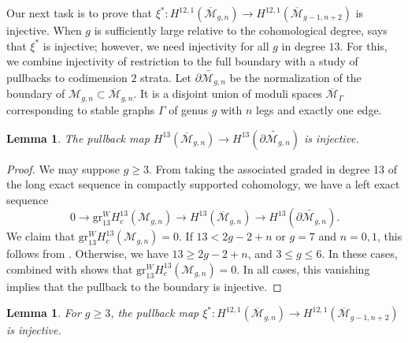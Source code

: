 \documentclass[12pt]{amsart}
\newtheorem{lem}[thm]{Lemma}
\theoremstyle{definition}
\numberwithin{equation}{section}
\newcommand{\M}{\mathcal{M}}
\renewcommand{\tilde}{\widetilde}
\newcommand{\Mb}{\overline{\M}}
\theoremstyle{definition} %
\theoremstyle{remark}
\newcommand{\gr}{\mathrm{gr}}
\begin{document}
Our next task is to prove that $\xi^*\colon H^{12,1}(\Mb_{g,n}) \to H^{12,1}(\Mb_{g-1,n+2})$ is injective. When $g$ is sufficiently large relative to the cohomological degree, \cite[Theorem 2.10]{ArbarelloCornalba} says that $\xi^*$ is injective; however, we need injectivity for all $g$ in degree $13$. For this, we combine injectivity of restriction to the full boundary with a study of pullbacks to codimension $2$ strata. Let $\tilde{\partial \M_{g,n}}$ be the normalization of the boundary of $\M_{g,n}\subset \Mb_{g,n}$. It is a disjoint union of moduli spaces $\Mb_{\Gamma}$ corresponding to stable graphs $\Gamma$ of genus $g$ with $n$ legs and exactly one edge.


\begin{lem} \label{bdryinj}
The pullback map $H^{13}(\Mb_{g,n}) \to H^{13}(\widetilde{\partial \M_{g,n}})$ is injective.
\end{lem}
\begin{proof}
We may suppose $g\geq 3$. From taking the associated graded in degree 13 of the long exact sequence in compactly supported cohomology, we have a left exact sequence
\[
    0\rightarrow \gr_{13}^W H^{13}_c(\M_{g,n})\rightarrow H^{13}(\Mb_{g,n})\rightarrow H^{13}(\tilde{\partial \M_{g,n}}).
\]
We claim that $\gr^W_{13} H^{13}_c(\M_{g,n})=0$. If $13<2g-2+n$ or $g = 7$ and $n = 0,1$, this follows from \cite[Proposition 2.1]{BergstromFaberPayne}. Otherwise, we have $13\geq 2g-2+n$, and $3 \leq g \leq 6$. In these cases, \cite[Theorem 1.4]{CL-CKgP} combined with \cite[Lemma 4.3]{CLP-STE} shows that $\gr_{13}^W H^{13}_c(\M_{g,n})=0$. In all cases, this vanishing implies that the pullback to the boundary is injective.
\end{proof}




\begin{lem} \label{xiin}
For $g \geq 3$, the pullback map $\xi^*\colon H^{12,1}(\Mb_{g,n}) \to H^{12,1}(\Mb_{g-1,n+2})$ is injective.
\end{lem}
\end{document}
